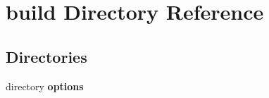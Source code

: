 \section{build Directory Reference}
\label{dir_4fef79e7177ba769987a8da36c892c5f}
\subsection*{Directories}
\begin{DoxyCompactItemize}
\item 
directory {\bf options}
\end{DoxyCompactItemize}
